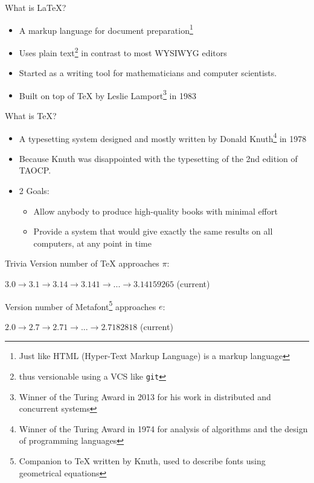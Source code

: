 \documentclass[12pt]{beamer}
\begin{document}
\begin{frame}{What is \LaTeX{}?}
  \begin{itemize}
    \item A markup language for document preparation\footnote{Just like HTML (Hyper-Text Markup Language) is a markup language}
    \item Uses plain text\footnote{thus versionable using a VCS like \texttt{git}} in contrast to most WYSIWYG editors
    \item Started as a writing tool for mathematicians and computer scientists.
    \item Built on top of \TeX{} by Leslie Lamport\footnote{Winner of the Turing Award in 2013 for his work in distributed and concurrent systems} in 1983
  \end{itemize}
\end{frame}

\begin{frame}{What is \TeX{}?}
  \begin{itemize}
    \item A typesetting system designed and mostly written by Donald Knuth\footnote{Winner of the Turing Award in 1974 for analysis of algorithms and the design of programming languages} in 1978
    \item Because Knuth was disappointed with the typesetting of the 2nd edition of TAOCP.
    \item 2 Goals:
          \begin{itemize}
            \item Allow anybody to produce high-quality books with minimal effort
            \item Provide a system that would give exactly the same results on all computers, at any point in time
          \end{itemize}
  \end{itemize}
\end{frame}

\begin{frame}{Trivia}
  Version number of \TeX{} approaches $\pi$:

  $3.0 \rightarrow 3.1 \rightarrow 3.14 \rightarrow 3.141 \rightarrow ... \rightarrow 3.14159265$ (current)

  Version number of Metafont\footnote{Companion to \TeX{} written by Knuth, used to describe fonts using geometrical equations} approaches $e$:

  $2.0 \rightarrow 2.7 \rightarrow 2.71 \rightarrow ... \rightarrow 2.7182818$ (current)
\end{frame}
\end{document}
